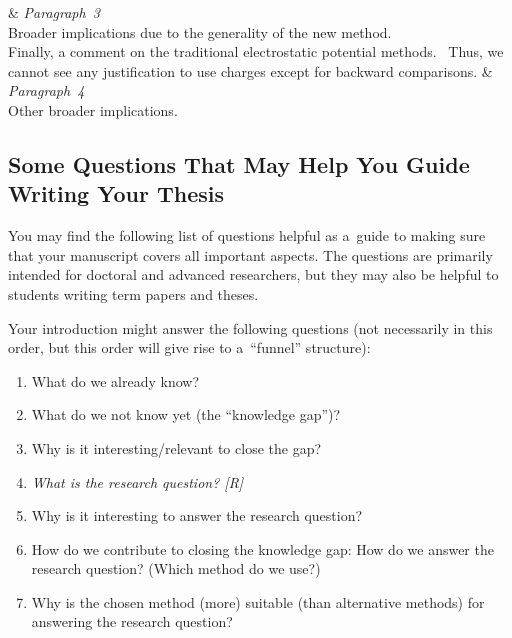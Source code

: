 \begin{longtblr}{}
	&
	{%
		\textit{Paragraph~3} \\
		Broader implications due to the generality of the new method.
	}
	\\
	\hspace{\smalllinespacing}Finally, a comment on the traditional electrostatic potential methods. \textellipsis\ Thus, we cannot see any justification to use  charges except for backward comparisons.
	&
	{%
		\textit{Paragraph~4} \\
		Other broader implications.
	}
\end{longtblr}

\endgroup

\subsection{Some Questions That May Help You Guide Writing Your Thesis}

You may find the following list of questions helpful as a~guide to making sure that your manu\-script covers all important aspects. The questions are primarily intended for doctoral and advanced researchers, but they may also be helpful to students writing term papers and theses.

Your introduction might answer the following questions (not necessarily in this order, but this order will give rise to a~``funnel'' structure):
\begin{enumerate}[labelindent = \parindent, leftmargin = 2\parindent]
	\item What do we already know?
	\item What do we not know yet (the ``knowledge gap'')?
	\item Why is it interesting\slash relevant to close the gap?
	\item \emph{What is the research question? [R]}
	\item Why is it interesting to answer the research question?
	\item How do we contribute to closing the knowledge gap: How do we answer the research question? (Which method do we use?)
	\item Why is the chosen method (more) suitable (than alternative methods) for answering the research question?
\end{enumerate}

